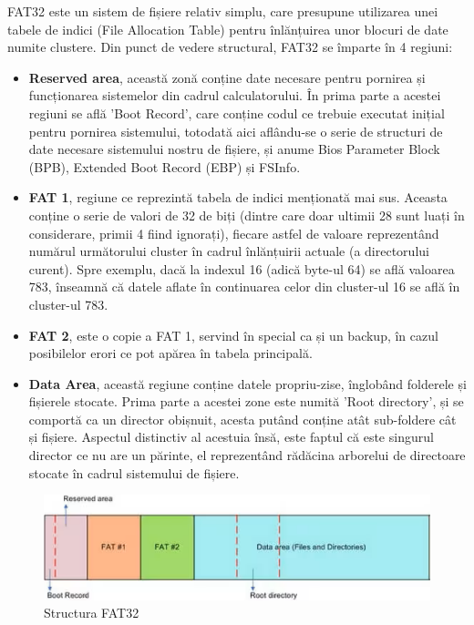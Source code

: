 FAT32 este un sistem de fișiere relativ simplu, care presupune utilizarea unei tabele de indici (File Allocation Table) pentru înlănțuirea unor blocuri de date numite clustere. Din punct de vedere structural, FAT32 se împarte în 4 regiuni:

\begin{itemize}
  \item \textbf{Reserved area}, această zonă conține date necesare pentru pornirea și funcționarea sistemelor din cadrul calculatorului. În prima parte a acestei regiuni se află 'Boot Record', care conține codul ce trebuie executat inițial pentru pornirea sistemului, totodată aici aflându-se o serie de structuri de date necesare sistemului nostru de fișiere, și anume Bios Parameter Block (BPB), Extended Boot Record (EBP) și FSInfo.
  
 \item \textbf{FAT 1}, regiune ce reprezintă tabela de indici menționată mai sus. Aceasta conține o serie de valori de 32 de biți (dintre care doar ultimii 28 sunt luați în considerare, primii 4 fiind ignorați), fiecare astfel de valoare reprezentând numărul următorului cluster în cadrul înlănțuirii actuale (a directorului curent). Spre exemplu, dacă la indexul 16 (adică byte-ul 64) se află valoarea 783, înseamnă că datele aflate în continuarea celor din cluster-ul 16 se află în cluster-ul 783.
 
 \item \textbf{FAT 2}, este o copie a FAT 1, servind în special ca și un backup, în cazul posibilelor erori ce pot apărea în tabela principală.
 
 \item \textbf{Data Area}, această regiune conține datele propriu-zise, înglobând folderele și fișierele stocate. Prima parte a acestei zone este numită 'Root directory', și se comportă ca un director obișnuit, acesta putând conține atât sub-foldere cât și fișiere. Aspectul distinctiv al acestuia însă, este faptul că este singurul director ce nu are un părinte, el reprezentând rădăcina arborelui de directoare stocate în cadrul sistemului de fișiere.  
\end{itemize}


\begin{figure}[h]
    \centering
    \includegraphics[width=1.0\linewidth]{images/2.4.png}
    \caption{Structura FAT32}
    \label{fig:enter-label}
\end{figure}

